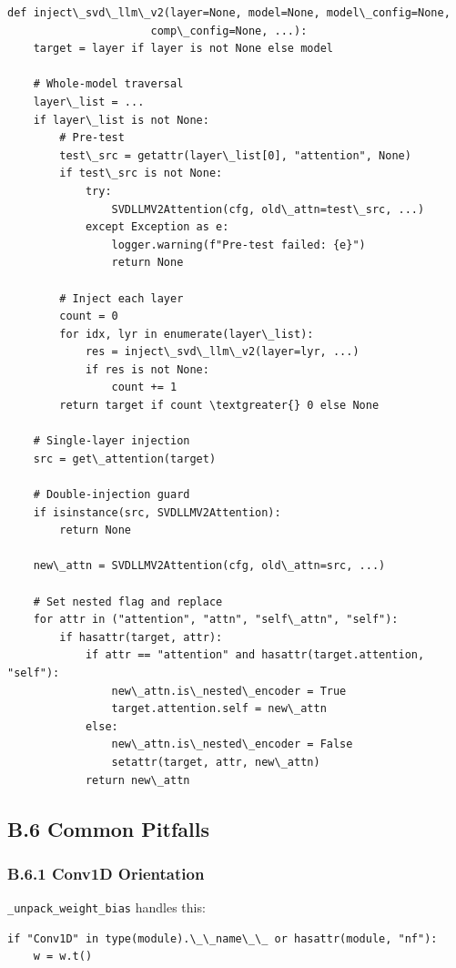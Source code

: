 \begin{lstlisting}
def inject\_svd\_llm\_v2(layer=None, model=None, model\_config=None,
                      comp\_config=None, ...):
    target = layer if layer is not None else model
    
    # Whole-model traversal
    layer\_list = ...
    if layer\_list is not None:
        # Pre-test
        test\_src = getattr(layer\_list[0], "attention", None)
        if test\_src is not None:
            try:
                SVDLLMV2Attention(cfg, old\_attn=test\_src, ...)
            except Exception as e:
                logger.warning(f"Pre-test failed: {e}")
                return None
        
        # Inject each layer
        count = 0
        for idx, lyr in enumerate(layer\_list):
            res = inject\_svd\_llm\_v2(layer=lyr, ...)
            if res is not None:
                count += 1
        return target if count \textgreater{} 0 else None
    
    # Single-layer injection
    src = get\_attention(target)
    
    # Double-injection guard
    if isinstance(src, SVDLLMV2Attention):
        return None
    
    new\_attn = SVDLLMV2Attention(cfg, old\_attn=src, ...)
    
    # Set nested flag and replace
    for attr in ("attention", "attn", "self\_attn", "self"):
        if hasattr(target, attr):
            if attr == "attention" and hasattr(target.attention, "self"):
                new\_attn.is\_nested\_encoder = True
                target.attention.self = new\_attn
            else:
                new\_attn.is\_nested\_encoder = False
                setattr(target, attr, new\_attn)
            return new\_attn
\end{lstlisting}

\subsection{B.6 Common Pitfalls}

\subsubsection{B.6.1 Conv1D Orientation}

\texttt{\_unpack\_weight\_bias} handles this:

\begin{lstlisting}
if "Conv1D" in type(module).\_\_name\_\_ or hasattr(module, "nf"):
    w = w.t()
\end{lstlisting}

